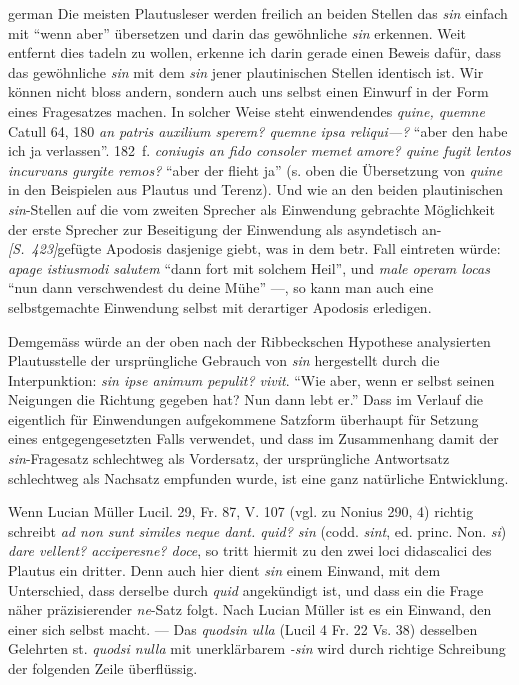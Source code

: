 \begin{otherlanguage*}{german}
Die meisten Plautusleser werden freilich an beiden Stellen das \emph{sin} einfach mit “wenn aber” übersetzen und darin das gewöhnliche \emph{sin} erkennen. Weit entfernt dies tadeln zu wollen, erkenne ich darin gerade einen Beweis dafür, dass das gewöhnliche \emph{sin} mit dem \emph{sin} jener plautinischen Stellen identisch ist. Wir können nicht bloss andern, sondern auch uns selbst einen Einwurf in der Form eines Fragesatzes machen. In solcher Weise steht einwendendes \emph{quine, quemne} Catull 64, 180 \emph{an patris auxilium sperem? quemne ipsa reliqui—?} “aber den habe ich ja verlassen”. 182~f. \emph{coniugis an fido consoler memet amore? quine fugit lentos incurvans gurgite remos?} “aber der flieht ja” (s. oben die Übersetzung von \emph{quine} in den Beispielen aus Plautus und Terenz). Und wie an den beiden plautinischen \emph{sin}-Stellen auf die vom zweiten Sprecher als Einwendung gebrachte Möglichkeit der erste Sprecher zur Beseitigung der Einwendung als asyndetisch an-\hypertarget{p423}{\emph{[S.~423]}}\label{p423}gefügte Apodosis dasjenige giebt, was in dem betr. Fall eintreten würde: \emph{apage istiusmodi salutem} “dann fort mit solchem Heil”, und \emph{male operam locas} “nun dann verschwendest du deine Mühe” —, so kann man auch eine selbstgemachte Einwendung selbst mit derartiger Apodosis erledigen.

Demgemäss würde an der oben nach der Ribbeckschen Hypothese analysierten Plautusstelle der ursprüngliche Gebrauch von \emph{sin} hergestellt durch die Interpunktion: \emph{sin ipse animum pepulit? vivit}. “Wie aber, wenn er selbst seinen Neigungen die Richtung gegeben hat? Nun dann lebt er.” Dass im Verlauf die eigentlich für Einwendungen aufgekommene Satzform überhaupt für Setzung eines entgegengesetzten Falls verwendet, und dass im Zusammenhang damit der \emph{sin}-Fragesatz schlechtweg als Vordersatz, der ursprüngliche Antwortsatz schlechtweg als Nachsatz empfunden wurde, ist eine ganz natürliche Entwicklung.

Wenn Lucian Müller Lucil. 29, Fr. 87, V. 107 (vgl. zu Nonius 290, 4) richtig schreibt \emph{ad non sunt similes neque dant. quid? sin} (codd. \emph{sint}, ed. princ. Non. \emph{si}) \emph{dare vellent? acciperesne? doce}, so tritt hiermit zu den zwei loci didascalici des Plautus ein dritter. Denn auch hier dient \emph{sin} einem Einwand, mit dem Unterschied, dass derselbe durch \emph{quid} angekündigt ist, und dass ein die Frage näher präzisierender \emph{ne}-Satz folgt. Nach Lucian Müller ist es ein Einwand, den einer sich selbst macht. — Das \emph{quodsin ulla} (Lucil 4 Fr. 22 Vs. 38) desselben Gelehrten st. \emph{quodsi nulla} mit unerklärbarem \emph{-sin} wird durch richtige Schreibung der folgenden Zeile überflüssig.


\end{otherlanguage*}

